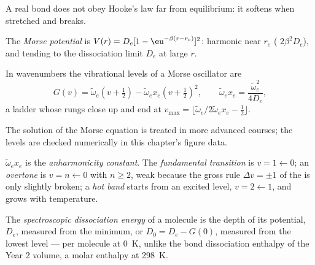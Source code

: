 A real bond does not obey Hooke's law far from equilibrium: it softens when
stretched and breaks.

\begin{definition}\label{def:b3:rovibrational-spectroscopy:morse}
The \emph{Morse potential} is $V(r) = D_e[1 -
\eu^{-\beta(r - r_e)}]^2$: harmonic near $r_e$ ( $2\beta^2D_e$), and
tending to the dissociation limit $D_e$ at large $r$.
\end{definition}

\begin{proposition}\label{prop:b3:rovibrational-spectroscopy:morse-levels}
In wavenumbers the vibrational levels of a Morse oscillator are
\[
G(v) = \tilde\omega_e(v + \tfrac12) - \tilde\omega_ex_e(v + \tfrac12)^2, \qquad
\tilde\omega_ex_e = \frac{\tilde\omega_e^2}{4D_e},
\]
a ladder whose rungs close up and end at $v_{\max} = \lfloor\tilde\omega_e/
2\tilde\omega_ex_e - \frac12\rfloor$.
\end{proposition}
\admitted

The solution of the Morse equation is treated in more advanced courses;
the levels are checked numerically in this chapter's figure data.

\begin{definition}\label{def:b3:rovibrational-spectroscopy:anharmonic}
$\tilde\omega_ex_e$ is the \emph{anharmonicity constant}. The \emph{fundamental transition}
is $v = 1 \leftarrow 0$; an \emph{overtone} is $v = n \leftarrow 0$
with $n \ge 2$, weak because the gross rule $\Delta v = \pm1$ of the  is only slightly broken; a \emph{hot band} starts
from an excited level, $v = 2 \leftarrow 1$, and grows with temperature.
\end{definition}

\begin{definition}\label{def:b3:rovibrational-spectroscopy:dissociation}
The \emph{spectroscopic dissociation energy} of a molecule is the depth of its potential, $D_e$, measured from the
minimum, or $D_0 = D_e - G(0)$, measured from the lowest level --- per
molecule at \qty{0}{K}, unlike the bond dissociation enthalpy of the Year 2
volume, a molar enthalpy at \qty{298}{K}.
\end{definition}

